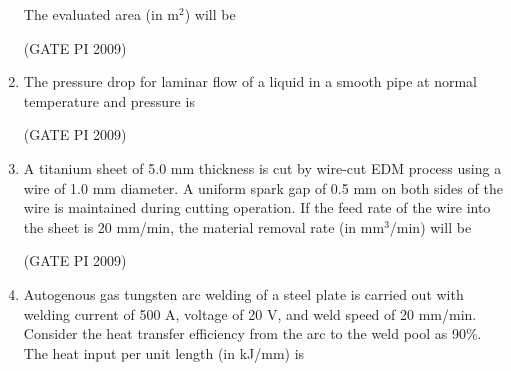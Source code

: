 \documentclass[journal,12pt,onecolumn]{IEEEtran}
\theoremstyle{remark}
\begin{document}
\begin{enumerate}
\begin{center}
\end{center}
The evaluated area (in m$^2$) will be
\begin{enumerate}
\end{enumerate}
\hfill (GATE PI 2009)
\item The pressure drop for laminar flow of a liquid in a smooth pipe at normal temperature and pressure is
\begin{enumerate}
\end{enumerate}
\hfill (GATE PI 2009)
\item A titanium sheet of 5.0 mm thickness is cut by wire-cut EDM process using a wire of 1.0 mm diameter. A uniform spark gap of 0.5 mm on both sides of the wire is maintained during cutting operation. If the feed rate of the wire into the sheet is 20 mm/min, the material removal rate (in mm$^3$/min) will be
\begin{enumerate}
\end{enumerate}
\hfill (GATE PI 2009)
\item Autogenous gas tungsten arc welding of a steel plate is carried out with welding current of 500 A, voltage of 20 V, and weld speed of 20 mm/min. Consider the heat transfer efficiency from the arc to the weld pool as 90\%. The heat input per unit length (in kJ/mm) is
\begin{enumerate}
\end{enumerate}


\end{enumerate}
\end{document}
